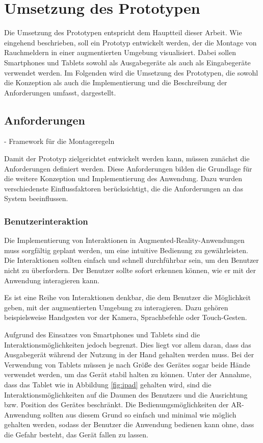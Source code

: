 \chapter{Umsetzung des Prototypen}

Die Umsetzung des Prototypen entspricht dem Hauptteil dieser Arbeit. Wie eingehend beschrieben, soll ein Prototyp entwickelt werden, der die Montage von Rauchmeldern in einer augmentierten Umgebung visualisiert. Dabei sollen Smartphones und Tablets sowohl als Ausgabegeräte als auch als Eingabegeräte verwendet werden. Im Folgenden wird die Umsetzung des Prototypen, die sowohl die Konzeption als auch die Implementierung  und die Beschreibung der Anforderungen umfasst, dargestellt.

\section{Anforderungen}

- Framework für die Montageregeln

Damit der Prototyp zielgerichtet entwickelt werden kann, müssen zunächst die Anforderungen definiert werden. Diese Anforderungen bilden die Grundlage für die weitere Konzeption und Implementierung des Anwendung. Dazu wurden verschiedenste Einflussfaktoren berücksichtigt, die die Anforderungen an das System beeinflussen.

\subsection{Benutzerinteraktion}

Die Implementierung von Interaktionen in Augmented-Reality-Anwendungen muss sorgfältig geplant werden, um eine intuitive Bedienung zu gewährleisten. Die Interaktionen sollten einfach und schnell durchführbar sein, um den Benutzer nicht zu überfordern. Der Benutzer sollte sofort erkennen können, wie er mit der Anwendung interagieren kann. 

Es ist eine Reihe von Interaktionen denkbar, die dem Benutzer die Möglichkeit geben, mit der augmentierten Umgebung zu interagieren. Dazu gehören beispielsweise Handgesten vor der Kamera, Sprachbefehle oder Touch-Gesten. 

Aufgrund des Einsatzes von Smartphones und Tablets sind die Interaktionsmöglichkeiten jedoch begrenzt. Dies liegt vor allem daran, dass das Ausgabegerät während der Nutzung in der Hand gehalten werden muss. Bei der Verwendung von Tablets müssen je nach Größe des Gerätes sogar beide Hände verwendet werden, um das Gerät stabil halten zu können. Unter der Annahme, dass das Tablet wie in Abbildung \ref{fig:ipad} gehalten wird, sind die Interaktionsmöglichkeiten auf die Daumen des Benutzers und die Ausrichtung bzw. Position des Gerätes beschränkt. Die Bedienungsmöglichkeiten der AR-Anwendung sollten aus diesem Grund so einfach und minimal wie möglich gehalten werden, sodass der Benutzer die Anwendung bedienen kann ohne, dass die Gefahr besteht, das Gerät fallen zu lassen.

